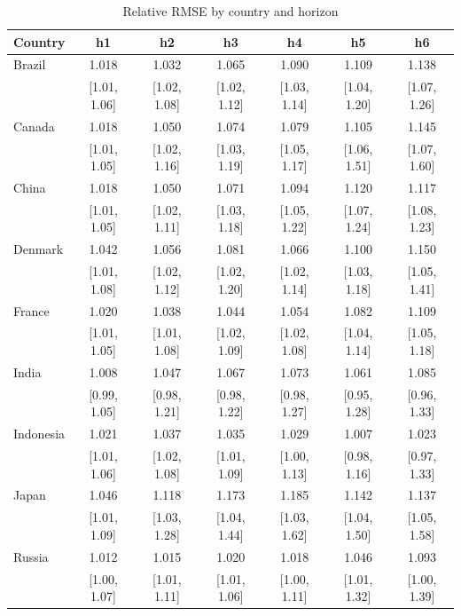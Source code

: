 \begin{table}[htbp]
\centering
\caption{Relative RMSE by country and horizon}
\label{tab:relrmse_country_horizon}
{\fontsize{8}{10}\selectfont\setlength{\tabcolsep}{3pt}
\begin{tabular*}{\textwidth}{@{\extracolsep{\fill}}lcccccc}
\toprule
Country & h1 & h2 & h3 & h4 & h5 & h6 \\
\midrule
Brazil & 1.018 & 1.032 & 1.065 & 1.090 & 1.109 & 1.138 \\
 & [1.01, 1.06] & [1.02, 1.08] & [1.02, 1.12] & [1.03, 1.14] & [1.04, 1.20] & [1.07, 1.26] \\
\addlinespace
Canada & 1.018 & 1.050 & 1.074 & 1.079 & 1.105 & 1.145 \\
 & [1.01, 1.05] & [1.02, 1.16] & [1.03, 1.19] & [1.05, 1.17] & [1.06, 1.51] & [1.07, 1.60] \\
\addlinespace
China & 1.018 & 1.050 & 1.071 & 1.094 & 1.120 & 1.117 \\
 & [1.01, 1.05] & [1.02, 1.11] & [1.03, 1.18] & [1.05, 1.22] & [1.07, 1.24] & [1.08, 1.23] \\
\addlinespace
Denmark & 1.042 & 1.056 & 1.081 & 1.066 & 1.100 & 1.150 \\
 & [1.01, 1.08] & [1.02, 1.12] & [1.02, 1.20] & [1.02, 1.14] & [1.03, 1.18] & [1.05, 1.41] \\
\addlinespace
France & 1.020 & 1.038 & 1.044 & 1.054 & 1.082 & 1.109 \\
 & [1.01, 1.05] & [1.01, 1.08] & [1.02, 1.09] & [1.02, 1.08] & [1.04, 1.14] & [1.05, 1.18] \\
\addlinespace
India & 1.008 & 1.047 & 1.067 & 1.073 & 1.061 & 1.085 \\
 & [0.99, 1.05] & [0.98, 1.21] & [0.98, 1.22] & [0.98, 1.27] & [0.95, 1.28] & [0.96, 1.33] \\
\addlinespace
Indonesia & 1.021 & 1.037 & 1.035 & 1.029 & 1.007 & 1.023 \\
 & [1.01, 1.06] & [1.02, 1.08] & [1.01, 1.09] & [1.00, 1.13] & [0.98, 1.16] & [0.97, 1.33] \\
\addlinespace
Japan & 1.046 & 1.118 & 1.173 & 1.185 & 1.142 & 1.137 \\
 & [1.01, 1.09] & [1.03, 1.28] & [1.04, 1.44] & [1.03, 1.62] & [1.04, 1.50] & [1.05, 1.58] \\
\addlinespace
Russia & 1.012 & 1.015 & 1.020 & 1.018 & 1.046 & 1.093 \\
 & [1.00, 1.07] & [1.01, 1.11] & [1.01, 1.06] & [1.00, 1.11] & [1.01, 1.32] & [1.00, 1.39] \\

\end{tabular*}}
\end{table}
